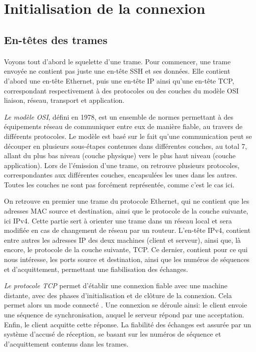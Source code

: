 \section{Initialisation de la connexion}
\subsection{En-têtes des trames}
\paragraph{}
Voyons tout d'abord le squelette d'une trame. Pour commencer, une trame envoyée ne contient pas juste une en-tête SSH et ses données. Elle contient d'abord une en-tête Ethernet, puis une en-tête IP ainsi qu'une en-tête TCP, correspondant respectivement à des protocoles ou des couches du modèle OSI liaison, réseau, transport et application. \cite{cadegros_etude_2023}

\begin{leftbar}
    \emph{Le modèle OSI}, défini en 1978, est un ensemble de normes permettant à des équipements réseau de communiquer entre eux de manière fiable, au travers de différents protocoles. Le modèle est basé sur le fait qu'une communication peut se découper en plusieurs sous-étapes contenues dans différentes couches, au total 7, allant du plus bas niveau (couche physique) vers le plus haut niveau (couche application). Lors de l'émission d'une trame, on retrouve plusieurs protocoles, correspondantes aux différentes couches, encapsulées les unes dans les autres. Toutes les couches ne sont pas forcément représentée, comme c'est le cas ici. \cite{gerossier_cours_2020}
\end{leftbar}

On retrouve en premier une trame du protocole Ethernet, qui ne contient que les adresses MAC source et destination, ainsi que le protocole de la couche suivante, ici IPv4. Cette partie sert à orienter une trame dans un réseau local et sera modifiée en cas de changement de réseau par un routeur.
L'en-tête IPv4, contient entre autres les adresses IP des deux machines (client et serveur), ainsi que, là encore, le protocole de la couche suivante, TCP.
Ce dernier, contient pour ce qui nous intéresse, les ports source et destination, ainsi que les numéros de séquences et d'acquittement, permettant une fiabilisation des échanges. \cite{cadegros_etude_2023}

\begin{leftbar}
    \emph{Le protocole TCP} permet d'établir une connexion fiable avec une machine distante, avec des phases d'initialisation et de clôture de la connexion. Cela permet alors un mode \og connecté \fg. Une connexion se déroule ainsi: le client envoie une séquence de synchronisation, auquel le serveur répond par une acceptation. Enfin, le client acquitte cette réponse. La fiabilité des échanges est assurée par un système d'accusé de réception, se basant sur les numéros de séquence et d'acquittement contenus dans les trames. \cite{gerossier_cours_2020}
\end{leftbar}

